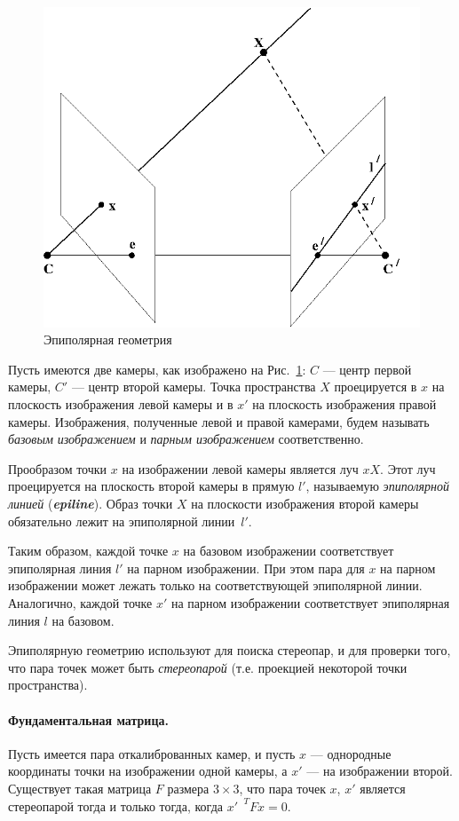 \documentclass[oneside,final,12pt]{scrartcl}
\begin{document}
			\begin{figure}[h]
				\centering
				\includegraphics[width=0.5\linewidth]{epipolar_geom.png}
				\caption{Эпиполярная геометрия}
				\label{fig:epipolargeom}
			\end{figure}

			Пусть имеются две камеры, как изображено на Рис.~\ref{fig:epipolargeom}: \(C\) — центр первой камеры, \(C'\) — центр второй камеры. Точка пространства \(X\) проецируется в \(x\) на плоскость изображения левой камеры и в \(x'\) на плоскость изображения правой камеры. Изображения, полученные левой и правой камерами, будем называть \textit{базовым изображением} и \textit{парным изображением} соответственно.

			Прообразом точки \(x\) на изображении левой камеры является луч \(xX\). Этот луч проецируется на плоскость второй камеры в прямую \(l'\), называемую \textit{эпиполярной линией} (\textbf{\textit{epiline}}). Образ точки \(X\) на плоскости изображения второй камеры обязательно лежит на эпиполярной линии~\(l'\).

			Таким образом, каждой точке \(x\) на базовом изображении соответствует эпиполярная линия \(l'\) на парном изображении. При этом пара для \(x\) на парном изображении может лежать только на соответствующей эпиполярной линии. Аналогично, каждой точке \(x'\) на парном изображении соответствует эпиполярная линия \(l\) на базовом.

			Эпиполярную геометрию используют для поиска стереопар, и для проверки того, что пара точек может быть \textit{стереопарой} (т.е. проекцией некоторой точки пространства).

			\paragraph{Фундаментальная матрица.} Пусть имеется пара откалиброванных камер, и пусть \(x\) — однородные координаты точки на изображении одной камеры, а \(x'\) — на изображении второй. Существует такая матрица \(F\) размера \(3 \times 3\), что пара точек \(x\), \(x'\) является стереопарой тогда и только тогда, когда \(x'^{\text{ }T} F x = 0\).
\end{document}
